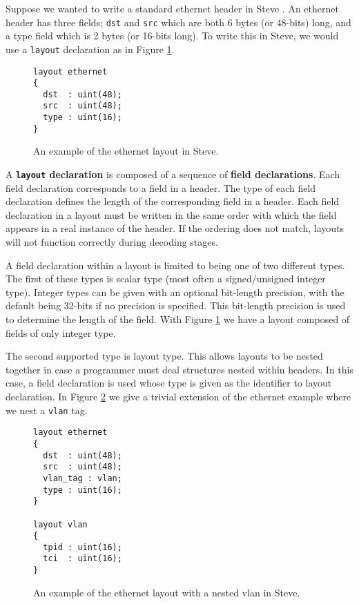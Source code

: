 Suppose we wanted to write a standard ethernet header in Steve \cite{eth_std}. An ethernet header has three fields; \texttt{dst} and \texttt{src} which are both 6 bytes (or 48-bits) long, and a type field which is 2 bytes (or 16-bits long). To write this in Steve, we would use a \texttt{layout} declaration as in Figure \ref{fg:eth_layout_ex}.

\begin{figure}[ht]
\begin{lstlisting}
layout ethernet
{
  dst  : uint(48);
  src  : uint(48);
  type : uint(16);
}
\end{lstlisting}
\caption{An example of the ethernet layout in Steve.}
\label{fg:eth_layout_ex}
\end{figure}

A \textbf{\texttt{layout} declaration} is composed of a sequence of \textbf{field declarations}. Each field declaration corresponds to a field in a header. The type of each field declaration defines the length of the corresponding field in a header. Each field declaration in a layout must be written in the same order with which the field appears in a real instance of the header. If the ordering does not match, layouts will not function correctly during decoding stages.   

A field declaration within a layout is limited to being one of two different types. The first of these types is scalar type (most often a signed/unsigned integer type). Integer types can be given with an optional bit-length precision, with the default being 32-bits if no precision is specified. This bit-length precision is used to determine the length of the field. With Figure \ref{fg:eth_layout_ex} we have a layout composed of fields of only integer type.

The second supported type is layout type. This allows layouts to be nested together in case a programmer must deal structures nested within headers. In this case, a field declaration is used whose type is given as the identifier to layout declaration. In Figure \ref{fg:nested_layout_ex} we give a trivial extension of the ethernet example where we nest a \texttt{vlan} tag.

\begin{figure}[ht]
\begin{lstlisting}
layout ethernet
{
  dst  : uint(48);
  src  : uint(48);
  vlan_tag : vlan;
  type : uint(16);
}

layout vlan
{
  tpid : uint(16);
  tci  : uint(16);
}
\end{lstlisting}
\caption{An example of the ethernet layout with a nested vlan in Steve.}
\label{fg:nested_layout_ex}
\end{figure}

